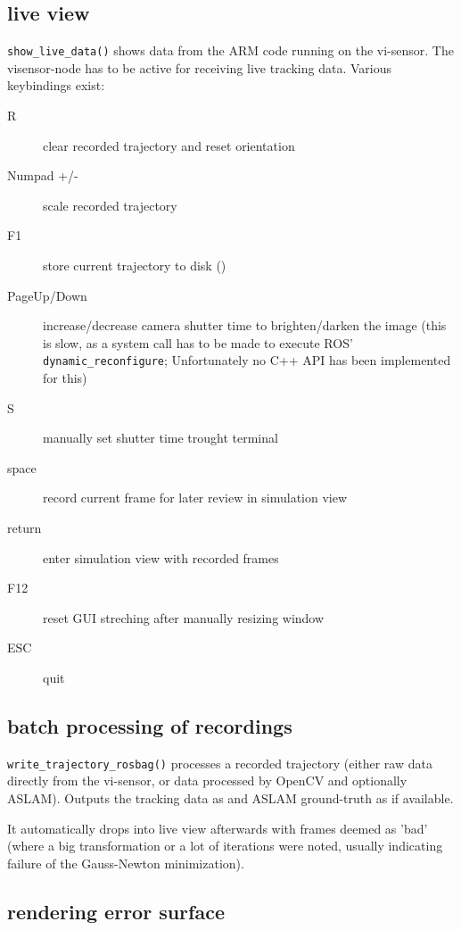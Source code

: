 \subsection{live view}

\texttt{show\_live\_data()} shows data from the ARM code running on the vi-sensor. The visensor-node has to be active for receiving live tracking data.
Various keybindings exist:

\begin{description}
    \item[R] clear recorded trajectory and reset orientation
    \item[Numpad +/-] scale recorded trajectory
    \item[F1] store current trajectory to disk ()
    \item[PageUp/Down] increase/decrease camera shutter time to brighten/darken
        the image (this is slow, as a system call has to be made to execute
        ROS' \texttt{dynamic\_reconfigure}; Unfortunately no C++ API has been
        implemented for this)
    \item[S] manually set shutter time trought terminal
    \item[space] record current frame for later review in simulation view
    \item[return] enter simulation view with recorded frames
    \item[F12] reset GUI streching after manually resizing window
    \item[ESC] quit
\end{description}


\subsection{batch processing of recordings}

\texttt{write\_trajectory\_rosbag()} processes a recorded trajectory (either
raw data directly from the vi-sensor, or data processed by OpenCV and
optionally ASLAM). Outputs the tracking data as 
and ASLAM ground-truth as  if available.

It automatically drops into live view afterwards with frames deemed as 'bad'
(where a big transformation or a lot of iterations were noted, usually
indicating failure of the Gauss-Newton minimization).


\subsection{rendering error surface}

